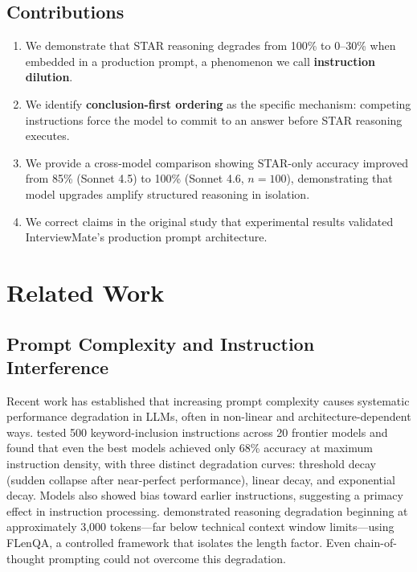 \documentclass[11pt]{article}
\begin{document}
\subsection{Contributions}

\begin{enumerate}[leftmargin=2em]
\item We demonstrate that STAR reasoning degrades from 100\% to 0--30\% when embedded in a production prompt, a phenomenon we call \textbf{instruction dilution}.
\item We identify \textbf{conclusion-first ordering} as the specific mechanism: competing instructions force the model to commit to an answer before STAR reasoning executes.
\item We provide a cross-model comparison showing STAR-only accuracy improved from 85\% (Sonnet 4.5) to 100\% (Sonnet 4.6, $n=100$), demonstrating that model upgrades amplify structured reasoning in isolation.
\item We correct claims in the original study that experimental results validated InterviewMate's production prompt architecture.
\end{enumerate}

\section{Related Work}

\subsection{Prompt Complexity and Instruction Interference}

Recent work has established that increasing prompt complexity causes systematic performance degradation in LLMs, often in non-linear and architecture-dependent ways. \citet{jaroslawicz2025} tested 500 keyword-inclusion instructions across 20 frontier models and found that even the best models achieved only 68\% accuracy at maximum instruction density, with three distinct degradation curves: threshold decay (sudden collapse after near-perfect performance), linear decay, and exponential decay. Models also showed bias toward earlier instructions, suggesting a primacy effect in instruction processing. \citet{levy2024} demonstrated reasoning degradation beginning at approximately 3,000 tokens---far below technical context window limits---using FLenQA, a controlled framework that isolates the length factor. Even chain-of-thought prompting could not overcome this degradation.
\end{document}
